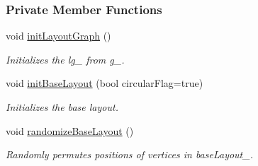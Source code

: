 \subsubsection*{Private Member Functions}
\begin{DoxyCompactItemize}
\item 
void \hyperlink{structStateGraph_a3a2f34053d23f4514629e1f24c55b4bd}{init\+Layout\+Graph} ()\hypertarget{structStateGraph_a3a2f34053d23f4514629e1f24c55b4bd}{}\label{structStateGraph_a3a2f34053d23f4514629e1f24c55b4bd}

\begin{DoxyCompactList}\small\item\em Initializes the {\ttfamily lg\+\_\+} from {\ttfamily g\+\_\+}. \end{DoxyCompactList}\item 
void \hyperlink{structStateGraph_a8034fde1f90f22813141f515ce38f497}{init\+Base\+Layout} (bool circular\+Flag=true)
\begin{DoxyCompactList}\small\item\em Initializes the base layout. \end{DoxyCompactList}\item 
void \hyperlink{structStateGraph_ac6247ce5f6ad30cf5f92d0b7784e7507}{randomize\+Base\+Layout} ()\hypertarget{structStateGraph_ac6247ce5f6ad30cf5f92d0b7784e7507}{}\label{structStateGraph_ac6247ce5f6ad30cf5f92d0b7784e7507}

\begin{DoxyCompactList}\small\item\em Randomly permutes positions of vertices in {\ttfamily base\+Layout\+\_\+}. \end{DoxyCompactList}\end{DoxyCompactItemize}
